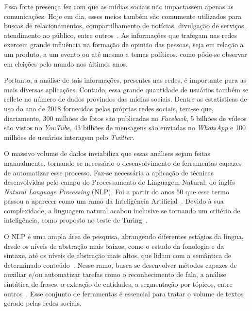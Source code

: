 Essa forte presença fez com que as mídias sociais não impactassem apenas as
comunicações.
Hoje em dia, esses meios também são comumente utilizados para buscas de
relacionamentos, compartilhamento de notícias, divulgação de serviços,
atendimento ao público, entre outros~\cite{mangold09}.
As informações que trafegam nas redes exercem grande influência na formação de
opinião das pessoas, seja em relação a um produto, a um evento ou até mesmo
a temas políticos, como pôde-se observar em eleições pelo mundo nos últimos anos.

Portanto, a análise de tais informações, presentes nas redes, é importante para
as mais diversas aplicações.
Contudo, essa grande quantidade de usuários também se reflete no número de dados
provindos das mídias sociais.
Dentre as estatísticas de uso do ano de 2018 fornecidas pelas próprias redes
sociais, tem-se que, diariamente, 300 milhões de fotos são publicadas no
\textit{Facebook}, 5 bilhões de vídeos são vistos no \textit{YouTube}, 43
bilhões de mensagens são enviadas no \textit{WhatsApp} e 100 milhões de usuários
interagem pelo \textit{Twitter}.

O massivo volume de dados inviabiliza que essas análises sejam feitas
manualmente, tornando-se necessário o desenvolvimento de ferramentas capazes de
automatizar esse processo.
Faz-se necessária a aplicação de técnicas desenvolvidas pelo campo do
Processamento de Linguagem Natural, do inglês \textit{Natural Language Processing}
(NLP).
Foi a partir do anos 50 que esse termo passou a aparecer como um ramo da
Inteligência Artificial~\cite{hutchins04}.
Devido à sua complexidade, a linguagem natural acabou inclusive se tornando um
critério de inteligência, como proposto no teste de Turing~\cite{turing50}.

O NLP é uma ampla área de pesquisa, abrangendo diferentes estágios da língua,
desde os níveis de abstração mais baixos, como o estudo da fonologia e da
sintaxe, até os níveis de abstração mais altos, que lidam com a semântica de
determinado conteúdo~\cite{nadkarni11}.
Nesse ramo, busca-se desenvolver métodos capazes de auxiliar e/ou automatizar
tarefas como o reconhecimento de fala, a análise sintática de frases, a
extração de entidades, a segmentação por tópicos, entre outros~\cite{hirschberg15}.
Esse conjunto de ferramentas é essencial para tratar o volume de textos
gerado pelas redes sociais.

